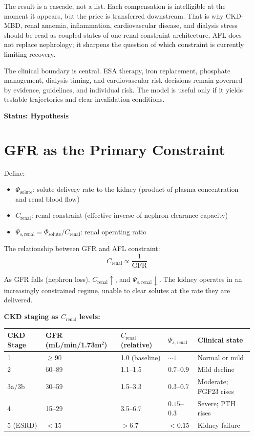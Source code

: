 \documentclass[12pt,a4paper]{article}
\begin{document}
The result is a cascade, not a list. Each compensation is intelligible at the moment it appears, but the price is transferred downstream. That is why CKD-MBD, renal anaemia, inflammation, cardiovascular disease, and dialysis stress should be read as coupled states of one renal constraint architecture. AFL does not replace nephrology; it sharpens the question of which constraint is currently limiting recovery.

The clinical boundary is central. ESA therapy, iron replacement, phosphate management, dialysis timing, and cardiovascular risk decisions remain governed by evidence, guidelines, and individual risk. The model is useful only if it yields testable trajectories and clear invalidation conditions.

\textbf{Status: Hypothesis}

\section{GFR as the Primary Constraint}

Define:
\begin{itemize}
    \item $\Phi_{\mathrm{solute}}$: solute delivery rate to the kidney (product of plasma concentration and renal blood flow)
    \item $C_{\mathrm{renal}}$: renal constraint (effective inverse of nephron clearance capacity)
    \item $\Psi_{s,\mathrm{renal}} = \Phi_{\mathrm{solute}} / C_{\mathrm{renal}}$: renal operating ratio
\end{itemize}

The relationship between GFR and AFL constraint:
\begin{equation}
    C_{\mathrm{renal}} \propto \frac{1}{\mathrm{GFR}}
\end{equation}

As GFR falls (nephron loss), $C_{\mathrm{renal}} \uparrow$, and $\Psi_{s,\mathrm{renal}} \downarrow$. The kidney operates in an increasingly constrained regime, unable to clear solutes at the rate they are delivered.

\textbf{CKD staging as $C_{\mathrm{renal}}$ levels:}
\begin{center}
\begin{tabular}{lllll}
\toprule
CKD Stage & GFR (mL/min/1.73m$^2$) & $C_{\mathrm{renal}}$ (relative) & $\Psi_{s,\mathrm{renal}}$ & Clinical state \\
\midrule
1 & $\geq 90$ & 1.0 (baseline) & $\sim 1$ & Normal or mild \\
2 & 60--89 & 1.1--1.5 & $0.7$--$0.9$ & Mild decline \\
3a/3b & 30--59 & 1.5--3.3 & $0.3$--$0.7$ & Moderate; FGF23 rises \\
4 & 15--29 & 3.5--6.7 & $0.15$--$0.3$ & Severe; PTH rises \\
5 (ESRD) & $< 15$ & $> 6.7$ & $< 0.15$ & Kidney failure \\
\bottomrule
\end{tabular}
\end{center}
\end{document}
